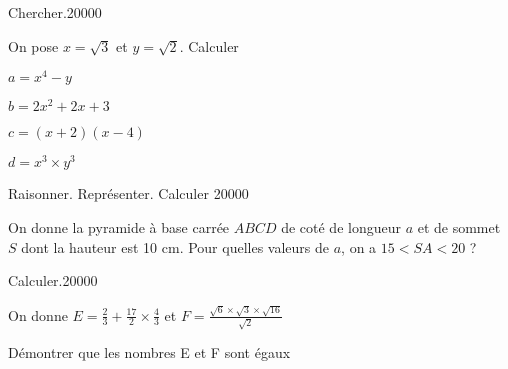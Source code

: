 
\begin{pageParcourst} %
 
 
 \begin{ExoCdN}{Chercher.}{2}{0}{0}{0}{0}

On pose $x = \sqrt{3}$ et $y=\sqrt{2}$. Calculer

\begin{enumerate}
\begin{minipage}{0.5\linewidth}
\item $a= x^4-y$
\item $b=2x^2+2x+3$
\end{minipage}
\begin{minipage}{0.5\linewidth}
\item $c=(x+2)(x-4)$
\item $d=x^3 \times y^3$
\end{minipage}
\end{enumerate}
\end{ExoCdN}


 
\begin{ExoCtN}{Raisonner. Représenter. Calculer }{2}{0}{0}{0}{0}
 
On donne la pyramide à base carrée $ABCD$ de coté de longueur $a$ et de sommet $S$ dont la hauteur est 10 cm.
Pour quelles valeurs de $a$, on a $15 < SA < 20$ ?
\end{ExoCtN}



\begin{ExoCtN}{Calculer.}{2}{0}{0}{0}{0}
 
On donne $E = \frac{2}{3}+\frac{17}{2} \times \frac{4}{3}$ et $F = \frac{\sqrt 6 \times \sqrt 3\times \sqrt{16} }{\sqrt 2}  $ 
 
Démontrer que les nombres E et F sont égaux
\end{ExoCtN}

 

%



\end{pageParcourst}
